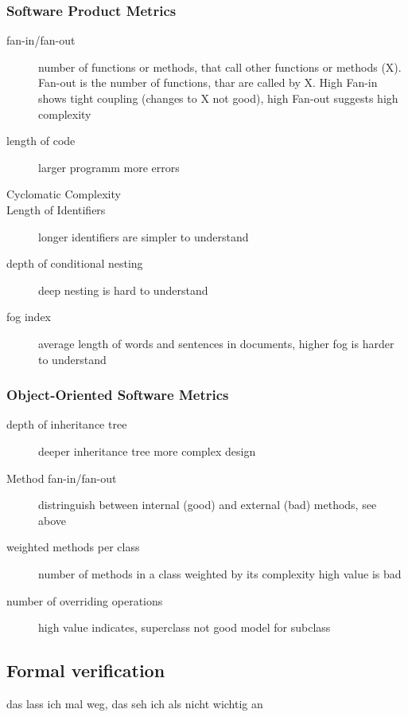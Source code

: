 \documentclass[a4paper, 10pt]{article}
\begin{document}
\subsubsection*{Software Product Metrics}
\begin{description}
	\item[fan-in/fan-out] number of functions or methods, that call other functions or methods (X). Fan-out is the number of functions, thar are called by X. High Fan-in shows tight coupling (changes to X not good), high Fan-out suggests high complexity
	\item[length of code] larger programm \follows more errors
	\item[Cyclomatic Complexity]
	\item[Length of Identifiers] longer identifiers are simpler to understand
	\item[depth of conditional nesting] deep nesting is hard to understand
	\item[fog index] average length of words and sentences in documents, higher fog is harder to understand
 \end{description}

\subsubsection*{Object-Oriented Software Metrics}
\begin{description}
	\item[depth of inheritance tree] deeper inheritance tree \follows more complex design
	\item[Method fan-in/fan-out] distringuish between internal (good) and external (bad) methods, see above
	\item[weighted methods per class] number of methods in a class weighted by its complexity \follows high value is bad
	\item[number of overriding operations] high value indicates, superclass not good model for subclass
\end{description}

\subsection*{Formal verification}
das lass ich mal weg, das seh ich als nicht wichtig an
\end{document}
